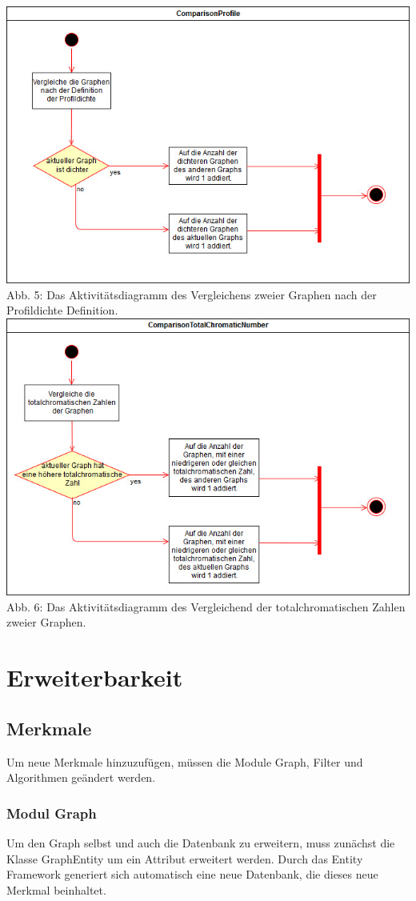 \documentclass[13pt]{scrreprt}
\begin{document}
\begin{center}
\includegraphics[scale = 0.75,center]{CompareProfile_Activity.jpg}
 Abb. 5: Das Aktivitätsdiagramm des Vergleichens zweier Graphen nach der Profildichte Definition.
\includegraphics[scale = 0.75,center]{CompareTCN.jpg}
 Abb. 6: Das Aktivitätsdiagramm des Vergleichend der totalchromatischen Zahlen zweier Graphen.
\end{center}

\chapter{Erweiterbarkeit}
\section{Merkmale}
Um neue Merkmale hinzuzufügen, müssen die Module Graph, Filter und Algorithmen geändert werden.
\subsection{Modul Graph}
Um den Graph selbst und auch die Datenbank zu erweitern, muss zunächst die Klasse GraphEntity um ein Attribut erweitert werden. Durch das Entity Framework generiert sich automatisch eine neue Datenbank, die dieses neue Merkmal beinhaltet.
\end{document}
